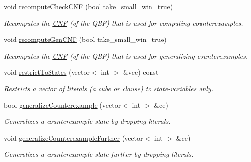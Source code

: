 \begin{DoxyCompactItemize}
void \hyperlink{classLearnSynthQBFInc_a9493b7c067234879ce68ba73cf510b59}{recompute\-Check\-C\-N\-F} (bool take\-\_\-small\-\_\-win=true)
\begin{DoxyCompactList}\small\item\em Recomputes the \hyperlink{classCNF}{C\-N\-F} (of the Q\-B\-F) that is used for computing counterexamples. \end{DoxyCompactList}\item 
void \hyperlink{classLearnSynthQBFInc_a98fa456db980f739d6825e1ee6c96cfa}{recompute\-Gen\-C\-N\-F} (bool take\-\_\-small\-\_\-win=true)
\begin{DoxyCompactList}\small\item\em Recomputes the \hyperlink{classCNF}{C\-N\-F} (of the Q\-B\-F) that is used for generalizing counterexamples. \end{DoxyCompactList}\item 
void \hyperlink{classLearnSynthQBFInc_acefbf03dca5bf13532c6fc3209a21e69}{restrict\-To\-States} (vector$<$ int $>$ \&vec) const 
\begin{DoxyCompactList}\small\item\em Restricts a vector of literals (a cube or clause) to state-\/variables only. \end{DoxyCompactList}\item 
bool \hyperlink{classLearnSynthQBFInc_a01b407cc989eae78f6f3e5c607a91dd5}{generalize\-Counterexample} (vector$<$ int $>$ \&ce)
\begin{DoxyCompactList}\small\item\em Generalizes a counterexample-\/state by dropping literals. \end{DoxyCompactList}\item 
void \hyperlink{classLearnSynthQBFInc_aa3c592148a51356dd2eb59e2cef9cb6b}{generalize\-Counterexample\-Further} (vector$<$ int $>$ \&ce)
\begin{DoxyCompactList}\small\item\em Generalizes a counterexample-\/state further by dropping literals. \end{DoxyCompactList}\end{DoxyCompactItemize}
